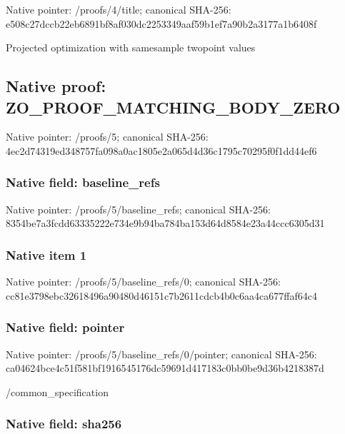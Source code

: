 \documentclass[10pt,a4paper]{article}
\begin{document}
Native pointer: /proofs/4/title; canonical SHA-256: e508c27dccb22eb6891bf8af\allowbreak{}030dc2253349aaf59b1ef7a9\allowbreak{}0b2a3177a1b6408f


Projected optimization with samesample twopoint values


\subsection{Native proof: ZO\_PROOF\_MATCHING\_BODY\_ZERO}


Native pointer: /proofs/5; canonical SHA-256: 4ec2d74319ed348757fa098a\allowbreak{}0ac1805e2a065d4d36c1795c\allowbreak{}70295f0f1dd44ef6



\subsubsection{Native field: baseline\_refs}


Native pointer: /proofs/5/baseline\_refs; canonical SHA-256: 8354be7a3fcdd63335222e73\allowbreak{}4e9b94ba784ba153d64d8584\allowbreak{}e23a44ccc6305d31



\subsubsection{Native item 1}


Native pointer: /proofs/5/baseline\_refs/0; canonical SHA-256: cc81e3798ebc32618496a904\allowbreak{}80d46151c7b2611cdcb4b0c6\allowbreak{}aa4ca677ffaf64c4



\subsubsection{Native field: pointer}


Native pointer: /proofs/5/baseline\_refs/0/pointer; canonical SHA-256: ca04624bce4c51f581bf1916\allowbreak{}545176dc59691d417183c0bb\allowbreak{}0be9d36b4218387d


/common\_specification


\subsubsection{Native field: sha256}
\end{document}
